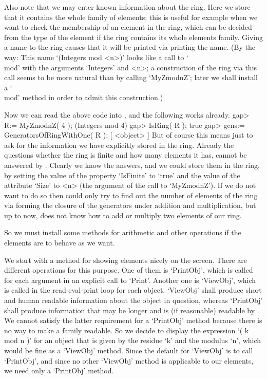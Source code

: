 Also note that we may enter known information about the ring.
Here we store that it contains the whole family of elements;
this is useful for example when we want to check the membership of an
element in the ring, which can be decided from the type of the element
if the ring contains its whole elements family.
Giving a name to the ring causes that it will be printed
via printing the name.
(By the way:
This name `(Integers mod <n>)' looks like a call to `\\mod' with the
arguments `Integers' and <n>;
a construction of the ring via this call seems to be more natural than
by calling `MyZmodnZ'; later we shall install a `\\mod' method in order
to admit this construction.)

Now we can read the above code into {\GAP},
and the following works already.
\begintt
gap> R:= MyZmodnZ( 4 );
(Integers mod 4)
gap> IsRing( R );
true
gap> gens:= GeneratorsOfRingWithOne( R );
[ <object> ]
\endtt
But of course this means just to ask for the information we have
explicitly stored in the ring.
Already the questions whether the ring is finite and how many elements
it has, cannot be answered by {\GAP}.
Clearly we know the answers, and we could store them in the ring,
by setting the value of the property `IsFinite' to `true' and the value
of the attribute `Size' to <n> (the argument of the call to `MyZmodnZ').
If we do not want to do so then {\GAP} could only try to find out the number
of elements of the ring via forming the closure of the generators
under addition and multiplication,
but up to now, {\GAP} does not know how to add or multiply two
elements of our ring.

So we must install some methods for arithmetic and other
operations if the elements are to behave as we want.

We start with a method for showing elements nicely on the screen.
There are different operations for this purpose.
One of them is `PrintObj', which is called for each argument in an
explicit call to `Print'.
Another one is `ViewObj', which is called in the read-eval-print loop
for each object.
`ViewObj' shall produce short and human readable information about the
object in question, whereas `PrintObj' shall produce information that
may be longer and is (if reasonable) readable by {\GAP}.
We cannot satisfy the latter requirement for a `PrintObj' method
because there is no way to make a family {\GAP} readable.
So we decide to display the expression `( k mod n )' for an object
that is given by the residue `k' and the modulus `n',
which would be fine as a `ViewObj' method.
Since the default for `ViewObj' is to call `PrintObj',
and since no other `ViewObj' method is applicable to our elements,
we need only a `PrintObj' method.

